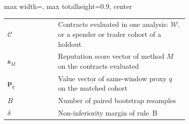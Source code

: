 \begin{table}[htbp]
\begin{adjustbox}{max width=\linewidth, max totalheight=0.9\textheight, center}
\begin{tabular}{lp{0.72\linewidth}}
$\mathcal{C}$ & Contracts evaluated in one analysis: $\mathcal{W}$, or a spender or trader cohort of a holdout \\
$\mathbf{s}_M$ & Reputation score vector of method $M$ on the contracts evaluated \\
$\mathbf{p}_q$ & Value vector of same-window proxy $q$ on the matched cohort \\
$B$ & Number of paired bootstrap resamples \\
$\delta$ & Non-inferiority margin of rule~B \\
\bottomrule
\end{tabular}%
\end{adjustbox}
\end{table}

\let\thetable\FrontMatterSavedThetable
